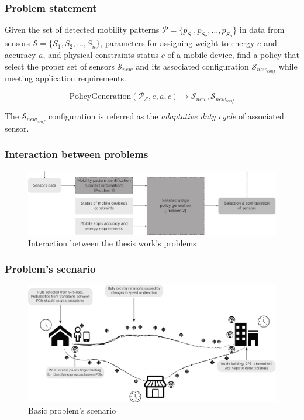 \documentclass[compress,9pt,xcolor={dvipsnames,table}]{beamer}
\begin{document}
\begin{frame}\frametitle{Problem statement}
\begin{tcolorbox}[title=Problem statement: Policy generation,colframe=PineGreen]
\small
Given the set of detected mobility patterns $\mathcal{P} = \{ p_{S_1}, p_{S_2}, \ldots, p_{S_n} \}$ in data from sensors $\mathcal{S} = \{ S_1,S_2,\ldots, S_n \}$, parameters for assigning weight to energy $e$ and accuracy $a$, and physical constraints status $c$ of a mobile device, find a policy that select the proper set of sensors $\mathcal{S}_{new}$ and its associated configuration $\mathcal{S}_{new_{conf}}$  while meeting application requirements.

\begin{equation}
  \text{PolicyGeneration}( \mathcal{P}_{\mathcal{S}}, e, a, c ) \longrightarrow{} \mathcal{S}_{new}, \mathcal{S}_{new_{conf}}
\end{equation}

The $\mathcal{S}_{new_{conf}}$ configuration is referred as the \emph{adaptative duty cycle} of associated sensor.
\end{tcolorbox}
\end{frame}

\begin{frame}\frametitle{Interaction between problems}
\begin{figure}[tb]
  \centering
  \includegraphics[width=\textwidth]{../../../resources/images/vectors/problems-incorporation}
  \caption{Interaction between the thesis work's problems}
  \label{fig:probems-incorporation}
\end{figure}
\end{frame}

\begin{frame}[t]\frametitle{Problem's scenario}
\begin{figure}[tb]
  \centering
  \includegraphics[width=\textwidth]{../../../resources/images/vectors/scenario}
  \caption{Basic problem's scenario}
  \label{fig:scenario}
\end{figure}
\end{frame}
\end{document}
